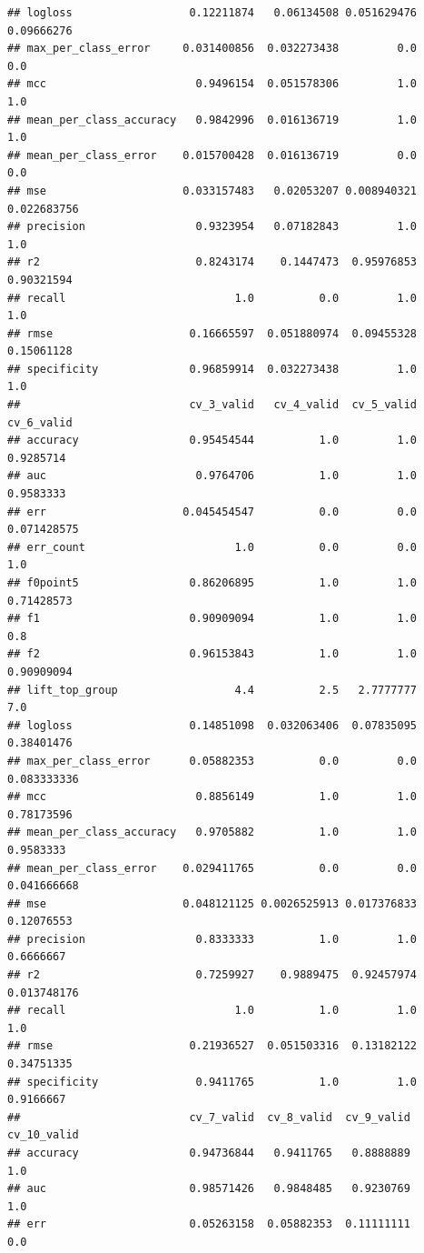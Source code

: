 \documentclass[]{article}
\begin{document}
\begin{verbatim}
## logloss                  0.12211874   0.06134508 0.051629476  0.09666276
## max_per_class_error     0.031400856  0.032273438         0.0         0.0
## mcc                       0.9496154  0.051578306         1.0         1.0
## mean_per_class_accuracy   0.9842996  0.016136719         1.0         1.0
## mean_per_class_error    0.015700428  0.016136719         0.0         0.0
## mse                     0.033157483   0.02053207 0.008940321 0.022683756
## precision                 0.9323954   0.07182843         1.0         1.0
## r2                        0.8243174    0.1447473  0.95976853  0.90321594
## recall                          1.0          0.0         1.0         1.0
## rmse                     0.16665597  0.051880974  0.09455328  0.15061128
## specificity              0.96859914  0.032273438         1.0         1.0
##                          cv_3_valid   cv_4_valid  cv_5_valid  cv_6_valid
## accuracy                 0.95454544          1.0         1.0   0.9285714
## auc                       0.9764706          1.0         1.0   0.9583333
## err                     0.045454547          0.0         0.0 0.071428575
## err_count                       1.0          0.0         0.0         1.0
## f0point5                 0.86206895          1.0         1.0  0.71428573
## f1                       0.90909094          1.0         1.0         0.8
## f2                       0.96153843          1.0         1.0  0.90909094
## lift_top_group                  4.4          2.5   2.7777777         7.0
## logloss                  0.14851098  0.032063406  0.07835095  0.38401476
## max_per_class_error      0.05882353          0.0         0.0 0.083333336
## mcc                       0.8856149          1.0         1.0  0.78173596
## mean_per_class_accuracy   0.9705882          1.0         1.0   0.9583333
## mean_per_class_error    0.029411765          0.0         0.0 0.041666668
## mse                     0.048121125 0.0026525913 0.017376833  0.12076553
## precision                 0.8333333          1.0         1.0   0.6666667
## r2                        0.7259927    0.9889475  0.92457974 0.013748176
## recall                          1.0          1.0         1.0         1.0
## rmse                     0.21936527  0.051503316  0.13182122  0.34751335
## specificity               0.9411765          1.0         1.0   0.9166667
##                          cv_7_valid  cv_8_valid  cv_9_valid cv_10_valid
## accuracy                 0.94736844   0.9411765   0.8888889         1.0
## auc                      0.98571426   0.9848485   0.9230769         1.0
## err                      0.05263158  0.05882353  0.11111111         0.0

\end{verbatim}
\end{document}
